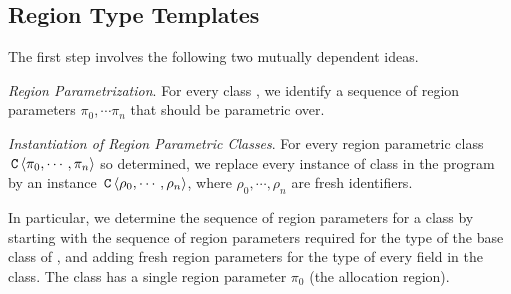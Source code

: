 \subsection{Region Type Templates}
\label{sec:fb-templatization}

The first step involves the following two mutually dependent ideas.

\emph{Region Parametrization}. For every class , we identify
a sequence of region parameters $\pi_0, \cdots \pi_n$ that 
should be parametric over.

\emph{Instantiation of Region Parametric Classes}. For every region
parametric class $\,{\tt C}\,\langle \pi_0, \cdots, \pi_n \rangle$ so determined,
we replace every instance of class  in the program by an instance
$\,{\tt C}\,\langle \rho_0, \cdots, \rho_n \rangle$, where $\rho_0, \cdots, \rho_n$
are fresh identifiers.

In particular, we determine the sequence of region parameters for a class 
by starting with the sequence of region parameters required for the type of
the base class of , and adding fresh region parameters for the type of every field
in the class.
The class  has a single region parameter $\pi_0$ (the allocation region).

